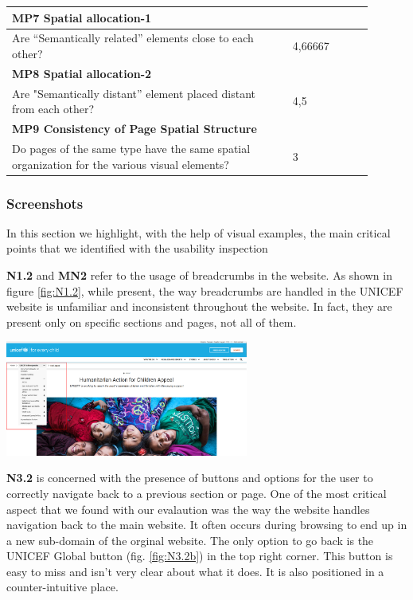 \begin{longtable}{|p{0.7\linewidth}|p{0.2\linewidth}|}
\multicolumn{2}{|l|}{\textbf{MP7 Spatial allocation-1}} \\
\hline
Are “Semantically related” elements close to each other? & 4,66667  \\
\hline

\multicolumn{2}{|l|}{\textbf{MP8 Spatial allocation-2}} \\
\hline
Are "Semantically distant” element placed distant from each other? & 4,5  \\
\hline

\multicolumn{2}{|l|}{\textbf{MP9 Consistency of Page Spatial Structure}} \\
\hline
Do pages of the same type have the same spatial organization for the various visual elements? & 3  \\
\hline

\end{longtable}

\subsubsection{Screenshots}
In this section we highlight, with the help of visual examples, the main critical points that we identified with the usability inspection

\textbf{N1.2} and \textbf{MN2} refer to the usage of breadcrumbs in the website. As shown in figure \ref{fig:N1.2}, while present, the way breadcrumbs are handled in the UNICEF website is unfamiliar and 
inconsistent throughout the website. In fact, they are present only on specific sections and pages, not all of them.

\begin{center}
    \includegraphics[width=0.6\textwidth]{img/critical_heuristics/MN2.png}
\end{center}

\vspace{1em}

\textbf{N3.2} is concerned with the presence of buttons and options for the user to correctly navigate back to a previous section or page. One of the most critical aspect that we found with our evalaution was the way
the website handles navigation back to the main website. It often occurs during browsing to end up in a new sub-domain of the orginal website. The only option to go back is the UNICEF Global button (fig. \ref{fig:N3.2b}) in the top right corner.
This button is easy to miss and isn't very clear about what it does. It is also positioned in a counter-intuitive place.



